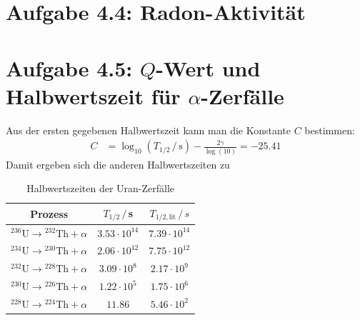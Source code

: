 \documentclass[a4paper,12pt]{article}
\newcommand{\tecxt}{}
\begin{document}
\section*{Aufgabe 4.4: Radon-Aktivität}
\section*{Aufgabe 4.5: $Q$-Wert und Halbwertszeit für $\alpha$-Zerfälle}
Aus der ersten gegebenen Halbwertszeit kann man die Konstante $C$ bestimmen:
\begin{align*}
C&=\log_{10}(T_{1/2}\,/\,\tecxt\text{s})-\frac{2\gamma}{\log(10)}=-25.41
\end{align*}
Damit ergeben sich die anderen Halbwertszeiten zu %
\begin{table}[h!]
\centering
\begin{tabular}{c|c|c}
Prozess&$T_{1/2}\,/\,$s&$T_{1/2,\tecxt\text{lit}}\,/\,s$\\ \hline
${}^{236}\tecxt\text{U} \longrightarrow {}^{232}\tecxt\text{Th} + \alpha$ &$3.53\cdot 10^{14}$&$7.39\cdot 10^{14}$\\ \hline
${}^{234}\tecxt\text{U} \longrightarrow {}^{230}\tecxt\text{Th} + \alpha$ &$2.06\cdot 10^{12}$&$7.75\cdot 10^{12}$\\ \hline
${}^{232}\tecxt\text{U} \longrightarrow {}^{228}\tecxt\text{Th} + \alpha$ &$3.09\cdot 10^8$&$2.17\cdot 10^{9}$\\ \hline
${}^{230}\tecxt\text{U} \longrightarrow {}^{226}\tecxt\text{Th} + \alpha$ &$1.22\cdot 10^5$&$1.75\cdot 10^{6}$\\ \hline
${}^{228}\tecxt\text{U} \longrightarrow {}^{224}\tecxt\text{Th} + \alpha$ &$11.86$&$5.46\cdot 10^{2}$\\
\end{tabular}
\caption{Halbwertszeiten der Uran-Zerfälle}
\end{table}
\end{document}
